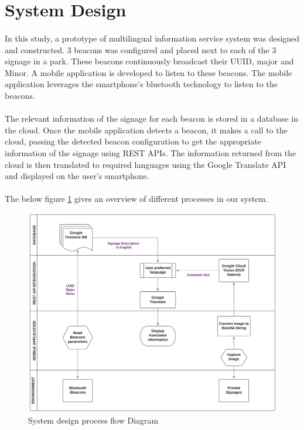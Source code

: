 \documentclass[12pt]{article}
\begin{document}

\section{System Design}
\label{system}
\paragraph{}In this study, a prototype of multilingual information service system was designed and constructed. 3 beacons was configured and placed next to each of the 3 signage in a park. These beacons continuously broadcast their UUID, major and Minor. A mobile application is developed to listen to these beacons. The mobile application leverages the smartphone’s bluetooth technology to listen to the beacons.

\paragraph{}The relevant information of the signage for each beacon is stored in a database in the cloud. Once the mobile application detects a beacon, it makes a call to the cloud, passing the detected beacon configuration to get the appropriate information of the signage using REST APIs. The information returned from the cloud is then translated to required languages using the Google Translate API and displayed on the user’s smartphone.

\paragraph{}The below figure \ref{fig:system} gives an overview of different processes in our system.

\begin{figure}[H]
	\centering
	\includegraphics[width=1\linewidth]{media/Architecture-3.png}
	\caption{System design process flow Diagram}
	\label{fig:system}
\end{figure} 
\end{document}
